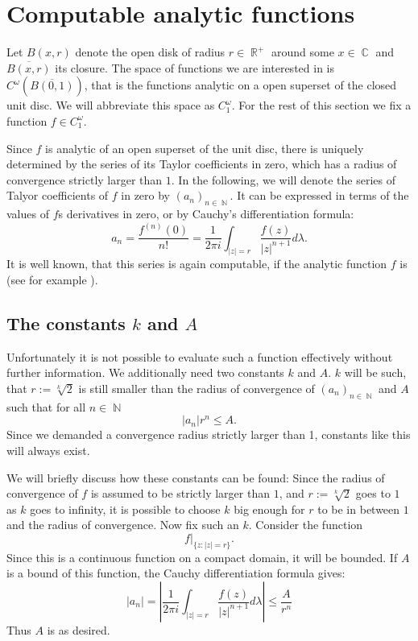 \documentclass{article}
\DeclareMathOperator{\NN}{\ensuremath{\mathbb{N}}\xspace}
\DeclareMathOperator{\RR}{\ensuremath{\mathbb{R}}\xspace}
\DeclareMathOperator{\CC}{\ensuremath{\mathbb{C}}\xspace}
\begin{document}
\section{Computable analytic functions}

Let $B(x,r)$ denote the open disk of radius $r\in\RR^+$ around some $x\in \CC$ and $\overline{B(x,r)}$ its closure. The space of functions we are interested in is $C^\omega(\overline{B(0,1)})$, that is the functions analytic on a open superset of the closed unit disc. We will abbreviate this space as $C^\omega_1$. For the rest of this section we fix a function $f\in C^\omega_1$.

Since $f$ is analytic of an open superset of the unit disc, there is uniquely determined by the series of its Taylor coefficients in zero, which has a radius of convergence strictly larger than $1$. In the following, we will denote the series of Talyor coefficients of $f$ in zero by $(a_n)_{n\in \NN}$. It can be expressed in terms of the values of $f$s derivatives in zero, or by Cauchy's differentiation formula:
\[ a_n = \frac{f^{(n)}(0)}{n!} = \frac 1 {2\pi i}\int_{|z| = r} \frac{f(z)}{|z|^{n+1}} d\lambda. \]
It is well known, that this series is again computable, if the analytic function $f$ is (see for example \cite[Chapter 1.2, Proposition 1]{MR1005942}).


\subsection[The constants k and A]{The constants $k$ and $A$}\label{sec: The constants k and A}

Unfortunately it is not possible to evaluate such a function effectively without further information. We additionally need two constants $k$ and $A$. $k$ will be such, that $r:=\sqrt[k]{2}$ is still smaller than the radius of convergence of $(a_n)_{n\in \NN}$ and $A$ such that for all $n\in \NN$
\[ |a_n|  r^n \leq A. \]
Since we demanded a convergence radius strictly larger than 1, constants like this will always exist.

We will briefly discuss how these constants can be found: Since the radius of convergence of $f$ is assumed to be strictly larger than $1$, and $r:=\sqrt[k] 2$ goes to $1$ as $k$ goes to infinity, it is possible to choose $k$ big enough for $r$ to be in between $1$ and the radius of convergence. Now fix such an $k$. Consider the function
\[ f|_{\{z:|z| = r\}}. \]
Since this is a continuous function on a compact domain, it will be bounded. If $A$ is a bound of this function, the Cauchy differentiation formula gives:
\[ |a_n |=  \left|\frac 1 {2\pi i}\int_{|z| = r} \frac{f(z)}{|z|^{n+1}} d\lambda\right| \leq \frac A {r^n} \]
Thus $A$ is as desired.
\end{document}
